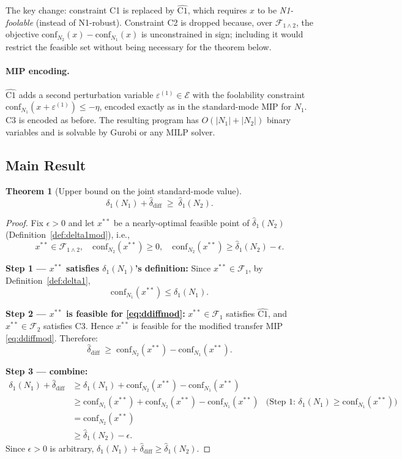 \documentclass[12pt]{article}
\theoremstyle{definition}
\theoremstyle{plain}
\newtheorem{theorem}{Theorem}[section]
\theoremstyle{remark}
\newcommand{\conf}[2]{\mathrm{conf}_{#1}(#2)}
\newcommand{\dN}[1]{\delta_1(N_{#1})}
\newcommand{\dNmod}[1]{\hat{\delta}_1(N_{#1})}
\newcommand{\ddiffmod}{\hat{\delta}_{\mathrm{diff}}}
\newcommand{\Edom}{\mathcal{E}}
\newcommand{\Ffool}[1]{\mathcal{F}_{#1}}
\newcommand{\Fjoint}{\mathcal{F}_{1\wedge 2}}
\begin{document}
\noindent
The key change: constraint C1 is replaced by $\widehat{\mathrm{C1}}$,
which requires $x$ to be \emph{N1-foolable} (instead of N1-robust).
Constraint C2 is dropped because, over $\Fjoint$, the objective
$\conf{N_2}{x}-\conf{N_1}{x}$ is unconstrained in sign;
including it would restrict the feasible set without being necessary
for the theorem below.

\paragraph{MIP encoding.}
$\widehat{\mathrm{C1}}$ adds a second perturbation variable
$\varepsilon^{(1)}\in\Edom$ with the foolability constraint
$\conf{N_1}{x+\varepsilon^{(1)}}\leq-\eta$, encoded exactly as in the
standard-mode MIP for $N_1$.  C3 is encoded as before.  The resulting
program has $O(|N_1|+|N_2|)$ binary variables and is solvable by
Gurobi or any MILP solver.

\subsection{Main Result}

\begin{theorem}[Upper bound on the joint standard-mode value]\label{thm:modified}
\[
  \boxed{\dN{1} + \ddiffmod \;\geq\; \dNmod{2}.}
\]
\end{theorem}

\begin{proof}
Fix $\epsilon>0$ and let $x^{**}$ be a nearly-optimal feasible point
of $\dNmod{2}$ (Definition~\ref{def:delta1mod}), i.e.,
\[
  x^{**}\in\Fjoint,\quad
  \conf{N_2}{x^{**}}\geq 0,\quad
  \conf{N_2}{x^{**}}\geq\dNmod{2}-\epsilon.
\]

\textbf{Step 1 — $x^{**}$ satisfies $\dN{1}$'s definition:}
Since $x^{**}\in\Ffool{1}$, by Definition~\ref{def:delta1},
\[
  \conf{N_1}{x^{**}}\leq\dN{1}.
\]

\textbf{Step 2 — $x^{**}$ is feasible for \eqref{eq:ddiffmod}:}
$x^{**}\in\Ffool{1}$ satisfies $\widehat{\mathrm{C1}}$, and
$x^{**}\in\Ffool{2}$ satisfies C3. Hence $x^{**}$ is feasible for
the modified transfer MIP \eqref{eq:ddiffmod}. Therefore:
\[
  \ddiffmod
  \;\geq\;
  \conf{N_2}{x^{**}}-\conf{N_1}{x^{**}}.
\]

\textbf{Step 3 — combine:}
\begin{align*}
  \dN{1}+\ddiffmod
  &\geq\dN{1}+\conf{N_2}{x^{**}}-\conf{N_1}{x^{**}}\\
  &\geq\conf{N_1}{x^{**}}+\conf{N_2}{x^{**}}-\conf{N_1}{x^{**}}
  &\text{(Step 1: $\dN{1}\geq\conf{N_1}{x^{**}}$)}\\
  &=\conf{N_2}{x^{**}}\\
  &\geq\dNmod{2}-\epsilon.
\end{align*}
Since $\epsilon>0$ is arbitrary, $\dN{1}+\ddiffmod\geq\dNmod{2}$.
\end{proof}
\end{document}
